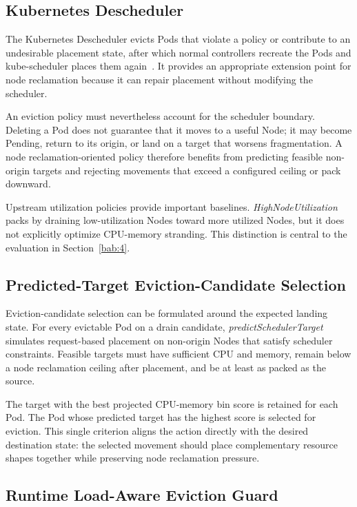 \subsection{Kubernetes Descheduler}
\label{sec:deschedulerLimitations}

The Kubernetes Descheduler evicts Pods that violate a policy or contribute to an undesirable placement state, after which normal controllers recreate the Pods and kube-scheduler places them again~\cite{k8s_descheduler_docs}. It provides an appropriate extension point for node reclamation because it can repair placement without modifying the scheduler.

An eviction policy must nevertheless account for the scheduler boundary. Deleting a Pod does not guarantee that it moves to a useful Node; it may become Pending, return to its origin, or land on a target that worsens fragmentation. A node reclamation-oriented policy therefore benefits from predicting feasible non-origin targets and rejecting movements that exceed a configured ceiling or pack downward.

Upstream utilization policies provide important baselines. \textit{HighNodeUtilization} packs by draining low-utilization Nodes toward more utilized Nodes, but it does not explicitly optimize CPU-memory stranding. This distinction is central to the evaluation in Section~\ref{bab:4}.

\subsection{Predicted-Target Eviction-Candidate Selection}
\label{sec:predictedTargetSelection}

Eviction-candidate selection can be formulated around the expected landing state. For every evictable Pod on a drain candidate, \textit{predictSchedulerTarget} simulates request-based placement on non-origin Nodes that satisfy scheduler constraints. Feasible targets must have sufficient CPU and memory, remain below a node reclamation ceiling after placement, and be at least as packed as the source.

The target with the best projected CPU-memory bin score is retained for each Pod. The Pod whose predicted target has the highest score is selected for eviction. This single criterion aligns the action directly with the desired destination state: the selected movement should place complementary resource shapes together while preserving node reclamation pressure.

\subsection{Runtime Load-Aware Eviction Guard}
\label{sec:runtimeLoadAwareEviction}

